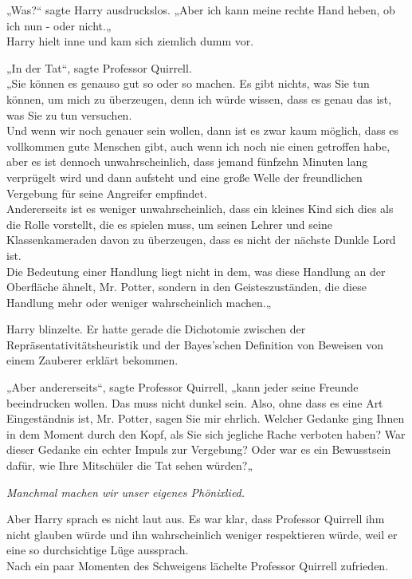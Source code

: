 {„Was?“ sagte Harry ausdruckslos. „Aber ich kann meine rechte Hand heben, ob ich nun - oder nicht.„\\ Harry hielt inne und kam sich ziemlich dumm vor.

„In der Tat“, sagte Professor Quirrell.\\ „Sie können es genauso gut so oder so machen. Es gibt nichts, was Sie tun können, um mich zu überzeugen, denn ich würde wissen, dass es genau das ist, was Sie zu tun versuchen.\\ Und wenn wir noch genauer sein wollen, dann ist es zwar kaum möglich, dass es vollkommen gute Menschen gibt, auch wenn ich noch nie einen getroffen habe, aber es ist dennoch unwahrscheinlich, dass jemand fünfzehn Minuten lang verprügelt wird und dann aufsteht und eine große Welle der freundlichen Vergebung für seine Angreifer empfindet.\\ Andererseits ist es weniger unwahrscheinlich, dass ein kleines Kind sich dies als die Rolle vorstellt, die es spielen muss, um seinen Lehrer und seine Klassenkameraden davon zu überzeugen, dass es nicht der nächste Dunkle Lord ist.\\ Die Bedeutung einer Handlung liegt nicht in dem, was diese Handlung an der Oberfläche ähnelt, Mr. Potter, sondern in den Geisteszuständen, die diese Handlung mehr oder weniger wahrscheinlich machen.„

Harry blinzelte. Er hatte gerade die Dichotomie zwischen der Repräsentativitätsheuristik und der Bayes'schen Definition von Beweisen von einem Zauberer erklärt bekommen.

„Aber andererseits“, sagte Professor Quirrell, „kann jeder seine Freunde beeindrucken wollen. Das muss nicht dunkel sein. Also, ohne dass es eine Art Eingeständnis ist, Mr. Potter, sagen Sie mir ehrlich. Welcher Gedanke ging Ihnen in dem Moment durch den Kopf, als Sie sich jegliche Rache verboten haben? War dieser Gedanke ein echter Impuls zur Vergebung? Oder war es ein Bewusstsein dafür, wie Ihre Mitschüler die Tat sehen würden?„

\emph{Manchmal machen wir unser eigenes Phönixlied.}

Aber Harry sprach es nicht laut aus. Es war klar, dass Professor Quirrell ihm nicht glauben würde und ihn wahrscheinlich weniger respektieren würde, weil er eine so durchsichtige Lüge aussprach.\\ Nach ein paar Momenten des Schweigens lächelte Professor Quirrell zufrieden.

}
